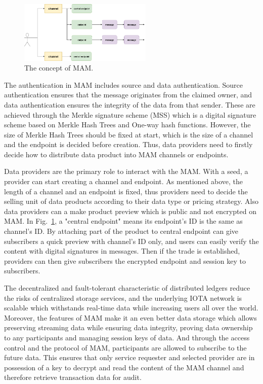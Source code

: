 \documentclass[conference]{IEEEtran}
\begin{document}
\begin{figure}[!t]
    \centering
    \includegraphics[width=2.5in]{mam_struct}
    \caption{The concept of MAM.}
    \label{fig:mam_struct}
\end{figure}

The authentication in MAM includes source and data authentication. Source authentication ensures that the message originates from the claimed owner, and data authentication ensures the integrity of the data from that sender. These are achieved through the Merkle signature scheme\cite{MSS} (MSS) which is a digital signature scheme based on Merkle Hash Trees and One-way hash functions. However, the size of Merkle Hash Trees should be fixed at start, which is the size of a channel and the endpoint is decided before creation. Thus, data providers need to firstly decide how to distribute data product into MAM channels or endpoints.

Data providers are the primary role to interact with the MAM. With a seed, a provider can start creating a channel and endpoint. As mentioned above, the length of a channel and an endpoint is fixed, thus providers need to decide the selling unit of data products according to their data type or pricing strategy. Also data providers can a make product preview which is public and not encrypted on MAM. In Fig.~\ref{fig:mam_struct}, a "central endpoint" means its endpoint's ID is the same as channel's ID. By attaching part of the product to central endpoint can give subscribers a quick preview with channel's ID only, and users can easily verify the content with digital signatures in messages. Then if the trade is established, providers can then give subscribers the encrypted endpoint and session key to subscribers.
 
The decentralized and fault-tolerant characteristic of distributed ledgers reduce the risks of centralized storage services, and the underlying IOTA network is scalable which withstands real-time data while increasing users all over the world. Moreover, the features of MAM make it an even better data storage which allows preserving streaming data while ensuring data integrity, proving data ownership to any participants and managing session keys of data. And through the access control and the protocol of MAM, participants are allowed to subscribe to the future data. This ensures that only service requester and selected provider are in possession of a key to decrypt and read the content of the MAM channel and therefore retrieve transaction data for audit.
\end{document}
